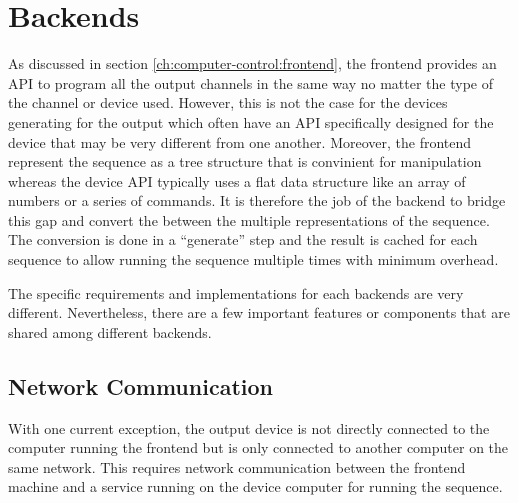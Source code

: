 \section{Backends}
\label{ch:computer-control:backend}
As discussed in section \ref{ch:computer-control:frontend},
the frontend provides an API to program all the output channels in the same way
no matter the type of the channel or device used.
However, this is not the case for the devices generating for the output
which often have an API specifically designed for the device
that may be very different from one another.
Moreover, the frontend represent the sequence as a tree structure
that is convinient for manipulation
whereas the device API typically uses a flat data structure like an array of numbers
or a series of commands.
It is therefore the job of the backend to bridge this gap
and convert the between the multiple representations of the sequence.
The conversion is done in a ``generate'' step and
the result is cached for each sequence to allow running the sequence
multiple times with minimum overhead.

The specific requirements and implementations for each backends are very different.
Nevertheless, there are a few important features or components that are shared among
different backends.

\subsection{Network Communication}
\label{ch:computer-control:backend:net}
With one current exception, the output device is not directly connected to
the computer running the frontend but is only connected to another computer
on the same network.
This requires network communication between the frontend machine and
a service running on the device computer for running the sequence.

